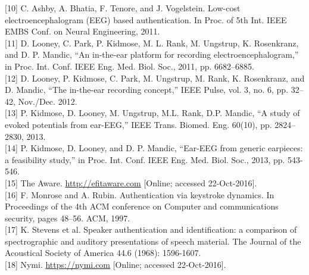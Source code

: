 \documentclass[11pt]{article}
\begin{document}
[10]
C. Ashby, A. Bhatia, F. Tenore, and J. Vogelstein. Low-cost electroencephalogram (EEG)
based authentication. In Proc. of 5th Int. IEEE EMBS Conf. on Neural Engineering, 2011.
\hspace{0pt} \\

[11]
D. Looney, C. Park, P. Kidmose, M. L. Rank, M. Ungstrup, K. Rosenkranz, and D. P.
Mandic, “An in-the-ear platform for recording electroencephalogram,” in Proc. Int. Conf.
IEEE Eng. Med. Biol. Soc., 2011, pp. 6682–6885.
\hspace{0pt} \\

[12]
D. Looney, P. Kidmose, C. Park, M. Ungstrup, M. Rank, K. Rosenkranz, and D. Mandic,
“The in-the-ear recording concept,” IEEE Pulse, vol. 3, no. 6, pp. 32–42, Nov./Dec. 2012.
\hspace{0pt} \\

[13]
P. Kidmose, D. Looney, M. Ungstrup, M.L. Rank, D.P. Mandic, “A study of evoked
potentials from ear-EEG,” IEEE Trans. Biomed. Eng. 60(10), pp. 2824–2830, 2013.
\hspace{0pt} \\

[14]
P. Kidmose, D. Looney, and D. P. Mandic, “Ear-EEG from generic earpieces: a feasibility
study,” in Proc. Int. Conf. IEEE Eng. Med. Biol. Soc., 2013, pp. 543-546.
\hspace{0pt} \\

[15] The Aware. \url{http://efitaware.com} [Online; accessed 22-Oct-2016].
\hspace{0pt} \\

[16] F. Monrose and A. Rubin. Authentication via keystroke dynamics. In Proceedings of the 4th
ACM conference on Computer and communications security, pages 48–56. ACM, 1997.
\hspace{0pt} \\

[17]
K. Stevens et al. Speaker authentication and identification: a comparison of spectrographic
and auditory presentations of speech material. The Journal of the Acoustical Society of
America 44.6 (1968): 1596-1607.
\hspace{0pt} \\

[18] Nymi. \url{https://nymi.com} [Online; accessed 22-Oct-2016].
\hspace{0pt} \\
\end{document}
